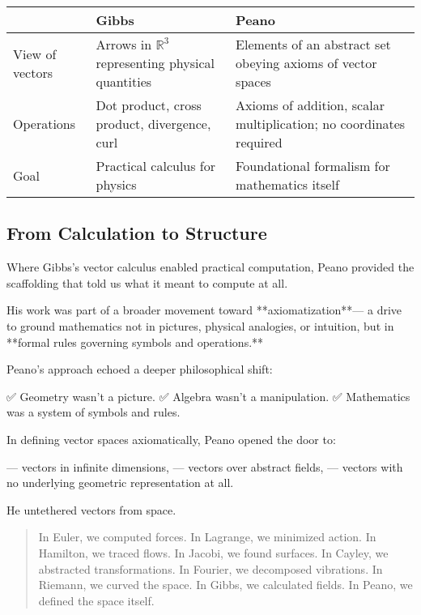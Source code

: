 \bigskip

\begin{tcolorbox}[colback=gray!5!white, colframe=black, title=\textbf{Sidebar: The Shift from Gibbs to Peano}, fonttitle=\bfseries, arc=1.5mm, boxrule=0.4pt]

\begin{tabular}{>{\raggedright}p{4cm} >{\raggedright}p{5.5cm} >{\raggedright\arraybackslash}p{5.5cm}}
 & \textbf{Gibbs} & \textbf{Peano} \\
\midrule
View of vectors & Arrows in \( \mathbb{R}^3 \) representing physical quantities & Elements of an abstract set obeying axioms of vector spaces \\
Operations & Dot product, cross product, divergence, curl & Axioms of addition, scalar multiplication; no coordinates required \\
Goal & Practical calculus for physics & Foundational formalism for mathematics itself
\end{tabular}

\end{tcolorbox}

\bigskip

\subsection*{From Calculation to Structure}

Where Gibbs’s vector calculus enabled practical computation,  
Peano provided the scaffolding that told us what it meant to compute at all.

His work was part of a broader movement toward **axiomatization**—  
a drive to ground mathematics not in pictures, physical analogies, or intuition,  
but in **formal rules governing symbols and operations.**

Peano’s approach echoed a deeper philosophical shift:

✅ Geometry wasn’t a picture.  
✅ Algebra wasn’t a manipulation.  
✅ Mathematics was a system of symbols and rules.

\bigskip

In defining vector spaces axiomatically, Peano opened the door to:

— vectors in infinite dimensions,  
— vectors over abstract fields,  
— vectors with no underlying geometric representation at all.

He untethered vectors from space.

\bigskip

\begin{quote}
In Euler, we computed forces.  
In Lagrange, we minimized action.  
In Hamilton, we traced flows.  
In Jacobi, we found surfaces.  
In Cayley, we abstracted transformations.  
In Fourier, we decomposed vibrations.  
In Riemann, we curved the space.  
In Gibbs, we calculated fields.  
In Peano, we defined the space itself.
\end{quote}

